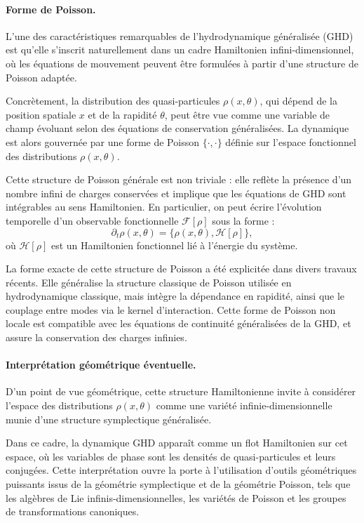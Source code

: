 \paragraph{Forme de Poisson.}
L’une des caractéristiques remarquables de l’hydrodynamique généralisée (GHD) est qu’elle s’inscrit naturellement dans un cadre Hamiltonien infini-dimensionnel, où les équations de mouvement peuvent être formulées à partir d’une structure de Poisson adaptée.

Concrètement, la distribution des quasi-particules $\rho(x,\theta)$, qui dépend de la position spatiale $x$ et de la rapidité $\theta$, peut être vue comme une variable de champ évoluant selon des équations de conservation généralisées. La dynamique est alors gouvernée par une forme de Poisson $\{ \cdot, \cdot \}$ définie sur l’espace fonctionnel des distributions $\rho(x,\theta)$.

Cette structure de Poisson générale est non triviale : elle reflète la présence d’un nombre infini de charges conservées et implique que les équations de GHD sont intégrables au sens Hamiltonien. En particulier, on peut écrire l’évolution temporelle d’un observable fonctionnelle $\mathcal{F}[\rho]$ sous la forme :
\[
\partial_t \rho(x,\theta) = \{ \rho(x,\theta), \mathcal{H}[\rho] \},
\]
où $\mathcal{H}[\rho]$ est un Hamiltonien fonctionnel lié à l’énergie du système.

La forme exacte de cette structure de Poisson a été explicitée dans divers travaux récents. Elle généralise la structure classique de Poisson utilisée en hydrodynamique classique, mais intègre la dépendance en rapidité, ainsi que le couplage entre modes via le kernel d’interaction. Cette forme de Poisson non locale est compatible avec les équations de continuité généralisées de la GHD, et assure la conservation des charges infinies.

\paragraph{Interprétation géométrique éventuelle.}
D’un point de vue géométrique, cette structure Hamiltonienne invite à considérer l’espace des distributions $\rho(x,\theta)$ comme une variété infinie-dimensionnelle munie d’une structure symplectique généralisée.

Dans ce cadre, la dynamique GHD apparaît comme un flot Hamiltonien sur cet espace, où les variables de phase sont les densités de quasi-particules et leurs conjugées. Cette interprétation ouvre la porte à l’utilisation d’outils géométriques puissants issus de la géométrie symplectique et de la géométrie Poisson, tels que les algèbres de Lie infinis-dimensionnelles, les variétés de Poisson et les groupes de transformations canoniques.

